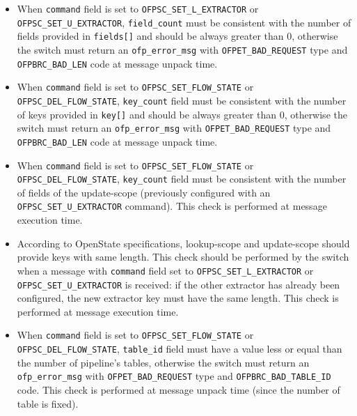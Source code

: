 \begin{itemize}
\item When \texttt{command} field is set to \texttt{OFPSC\_SET\_L\_EXTRACTOR} or \texttt{OFPSC\_SET\_U\_EXTRACTOR}, \texttt{field\_count} must be consistent with the number of fields provided in \texttt{fields[]} and should be always greater than 0, otherwise the switch must return an \texttt{ofp\_error\_msg} with \texttt{OFPET\_BAD\_REQUEST} type and \texttt{OFPBRC\_BAD\_LEN} code at message unpack time.

\item When \texttt{command} field is set to \texttt{OFPSC\_SET\_FLOW\_STATE} or \texttt{OFPSC\_DEL\_FLOW\_STATE}, \texttt{key\_count} field must be consistent with the number of keys provided in \texttt{key[]} and should be always greater than 0, otherwise 
the switch must return an \texttt{ofp\_error\_msg} with \texttt{OFPET\_BAD\_REQUEST} type and \texttt{OFPBRC\_BAD\_LEN} code at message unpack time.

\item When \texttt{command} field is set to \texttt{OFPSC\_SET\_FLOW\_STATE} or \texttt{OFPSC\_DEL\_FLOW\_STATE}, \texttt{key\_count} field must be consistent with the number of fields of the update-scope (previously configured with an \texttt{OFPSC\_SET\_U\_EXTRACTOR} command). This check is performed at message execution time.

\item According to OpenState specifications, lookup-scope and update-scope should provide keys with same length. This check should be performed by the switch when a message with \texttt{command} field set to \texttt{OFPSC\_SET\_L\_EXTRACTOR} or \texttt{OFPSC\_SET\_U\_EXTRACTOR} is received: if the other extractor has already been configured, the new extractor key must have the same length. This check is performed at message execution time.

\item When \texttt{command} field is set to \texttt{OFPSC\_SET\_FLOW\_STATE} or \texttt{OFPSC\_DEL\_FLOW\_STATE}, \texttt{table\_id} field must have a value less or equal than the number of pipeline’s tables, otherwise the switch must return an \texttt{ofp\_error\_msg} with \texttt{OFPET\_BAD\_REQUEST} type and \texttt{OFPBRC\_BAD\_TABLE\_ID} code. This check is performed at message unpack time (since the number of table is fixed).

\end{itemize}

